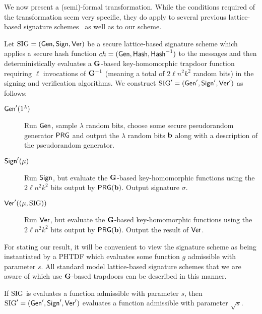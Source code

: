 We now present a (semi)-formal transformation. While the conditions required
of the transformation seem very specific, they do apply to several
previous lattice-based signature
schemes~\cite{DBLP:conf/crypto/DucasM14,DBLP:conf/pkc/Alperin-Sheriff15}
as well as to our scheme.


Let $\text{SIG} = (\mathsf{Gen}, \mathsf{Sign}, \mathsf{Ver})$ be a secure
lattice-based signature scheme which applies a secure
hash function $ch=(\mathsf{Gen},\mathsf{Hash},\mathsf{Hash}^{-1})$ to the messages and then
deterministically evaluates a $\mathbf{G}$-based key-homomorphic trapdoor
function requiring $\ell$ invocations of $\mathbf{G}^{-1}$ (meaning a total
of $2\ell n^2k^2$ random bits) in the signing and verification
algorithms. We construct $\text{SIG}'=(\mathsf{Gen}',\mathsf{Sign}',\mathsf{Ver}')$ as
follows:

\begin{description}
\item[$\mathsf{Gen}'(1^\lambda)$] Run $\mathsf{Gen}$, sample $\lambda$ random
  bits, choose some secure pseudorandom generator
  $\mathsf{PRG}$ and
  output the $\lambda$ random bits $\mathbf{b}$ along with a description of the
  pseudorandom generator. 
\item[$\mathsf{Sign}'(\mu)$] Run $\mathsf{Sign}$, but evaluate the $\mathbf{G}$-based
  key-homomorphic functions using the $2\ell n^2 k^2$ bits output by
  $\mathsf{PRG}(\mathbf{b})$. Output signature $\sigma$.
\item[$\mathsf{Ver}'((\mu,\text{SIG}))$] Run $\mathsf{Ver}$, but evaluate the $\mathbf{G}$-based
  key-homomorphic functions using the $2\ell n^2 k^2$ bits output by
  $\mathsf{PRG}(\mathbf{b})$. Output the result of $\mathsf{Ver}$. 
\end{description}

For stating our result, it will be convenient to view the signature
scheme as being instantiated by a PHTDF which evaluates some
function $g$ admissible with parameter $s$. All standard model lattice-based
signature schemes that we are aware of which use $\mathbf{G}$-based
trapdoors can be described in this manner.
\begin{theorem}[Informal]\label{thm:ch-transform} If $\text{SIG}$ is evaluates a
  function admissible with parameter $s$, then
$\text{SIG}'=(\mathsf{Gen}',\mathsf{Sign}',\mathsf{Ver}')$ evaluates a function admissible
with parameter $\sqrt{s}$. 
\end{theorem}

